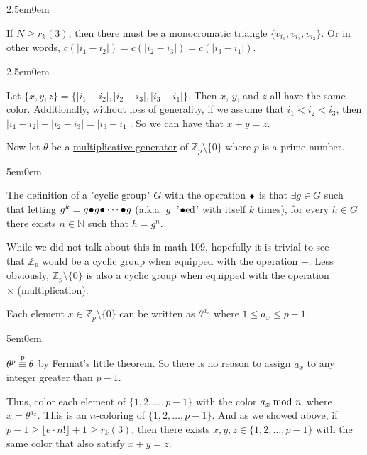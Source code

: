 \documentclass{book}
\newcommand{\hFour}{%
   \color{Cerulean}
   \fontsize{12}{14}\selectfont%
}
\newcommand{\myComment}{%
   \color{RawerSienna}%
   \fontsize{12}{14}\selectfont%
}
\newenvironment{myIndent}{%
   \begin{adjustwidth}{2.5em}{0em}%
}{%
   \end{adjustwidth}%
}
\newenvironment{myDindent}{%
   \begin{adjustwidth}{5em}{0em}%
}{%
   \end{adjustwidth}%
}
\newcommand{\udefine}[1]{{%
   \setulcolor{Red}%
   \setul{0.14em}{0.07em}%
   \ul{#1}%
}}
\newcommand{\myequiv}[1]{\stackrel{\mathclap{\mbox{\footnotesize{$#1$}}}}{\equiv}}
\newcommand{\filledcirc}[1][.]{\ensuremath{\hspace{0.05em}{\color{#1}\bullet}\mathllap{\circ}\hspace{0.05em}}}
\newcommand{\retTwo}{\hfill\bigbreak}
\begin{document}
{\begin{myIndent}
   \newpage

   If $N \geq r_k(3)$, then there must be a monocromatic triangle $\{v_{i_1}, v_{i_2}, v_{i_3}\}$. Or in\\ other words, $c(|i_1 - i_2|) = c(|i_2 - i_3|) = c(|i_3 - i_1|)$.\retTwo

   {\begin{myIndent} \hFour
      Let $\{x, y, z\} = \{|i_1 - i_2|, |i_2 - i_3|, |i_3 - i_1|\}$. Then $x$, $y$, and $z$ all have the same color. Additionally, without loss of generality, if we assume that $i_1 < i_2 < i_3$, then $|i_1 - i_2| + |i_2 - i_3| = |i_3 - i_1|$. So we can have that $x + y = z$.\retTwo
   \end{myIndent}}

   Now let $\theta$ be a \udefine{multiplicative generator} of $\mathbb{Z}_p \setminus \{0\}$ where $p$ is a prime number. \retTwo
   
   {\begin{myDindent} \myComment
      The definition of a "cyclic group" $G$ with the operation $\filledcirc$ is that $\exists g \in G$ such that letting $g^k = g \filledcirc g \filledcirc \cdots \filledcirc g$ (a.k.a $\phantom{|}g\phantom{|}$ '$\filledcirc\text{ed}$' with itself $k$ times), for every $h \in G$ there exists $n \in \mathbb{N}$ such that $h = g^n$. \retTwo

      While we did not talk about this in math 109, hopefully it is trivial to see\\ that $\mathbb{Z}_p$ would be a cyclic group when equipped with the operation $+$. Less obviously, $\mathbb{Z}_p \setminus \{0\}$ is also a cyclic group when equipped with the operation\\ ${\times}$ (multiplication).\retTwo


   \end{myDindent}}

   Each element $x \in \mathbb{Z}_p \setminus \{0\}$ can be written as $\theta^{a_x}$ where $1 \leq a_x \leq p - 1$.
   {\begin{myDindent} \myComment
      $\theta^p \myequiv{p} \theta$ by Fermat's little theorem. So there is no reason to assign $a_x$ to any integer greater than $p-1$.\retTwo
   \end{myDindent}}

   Thus, color each element of $\{1, 2, \ldots, p-1\}$ with the color $a_x {\hspace{-0.4em}\mod{n}}\hspace{0.1em}$ where\\ $x = \theta^{a_x}$. This is an $n$-coloring of $\{1, 2, \ldots, p-1\}$. And as we showed above, if $p - 1 \geq \lfloor e\cdot n! \rfloor + 1 \geq r_k(3)$, then there exists $x, y, z \in \{1, 2, \ldots, p-1\}$ with the same color that also satisfy $x + y = z$.\retTwo
   

\end{myIndent}}
\end{document}
